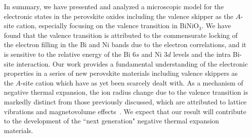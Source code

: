 \documentclass[aps,twocolumn,prl,showpacs,preprintnumbers,amsmath,amssymb]{revtex4}
\begin{document}
In summary, we have presented and analyzed a microscopic model for the electronic states in the perovskite oxides including the valence skipper as the $A$-site cation, especially focusing on the valence transition in BiNiO$_3$. 
We have found that the valence transition is attributed to the commensurate locking of the electron filling in the Bi and Ni bands due to the electron correlations, and it is sensitive to the relative energy of the Bi $6s$ and Ni $3d$ levels and the intra Bi-site interaction. 
Our work provides a fundamental understanding of the electronic properties in a series of new perovskite materials including valence skippers as the $A$-site cation which have as yet been scarcely dealt with. 
As a mechanism of negative thermal expansion, the ion radius change due to the valence transition is markedly distinct from those previously discussed, which are attributed to lattice vibrations and magnetovolume effects~\cite{Takenaka}. 
We expect that our result will contribute to the development of the ``next generation" negative thermal expansion materials. 
\end{document}
